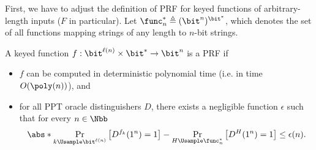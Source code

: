 \begin{answer}[a]
    First, we have to adjust the definition of PRF for keyed functions of arbitrary-length inputs ($F$ in particular).
    Let $\func_n^\ast\triangleq (\bit^n)^{\bit^\ast}$, which denotes the set of all functions mapping strings of any length to $n$-bit strings.
    \begin{definition}[PRF]\label{def:p4-1-1}
        A keyed function $f:\bit^{\ell(n)}\times \bit^\ast \to \bit^n$ is a PRF if
        \begin{itemize}\vspace{-0.3cm}
            \item $f$ can be computed in deterministic polynomial time (i.e. in time $O(\poly(n))$), and
            \item for all PPT oracle distinguishers $D$, there exists a negligible function $\epsilon$ such that for every $n\in\Nbb$
            \[
                \abs*{\Pr_{k\Usample\bit^{\ell(n)}}\left[D^{f_k}(1^n)=1\right] - \Pr_{H\Usample\func_n^\ast}\left[D^{H}(1^n)=1\right]}
                \le \epsilon(n).
            \]
        \end{itemize}
    \end{definition}
    

\end{answer}
